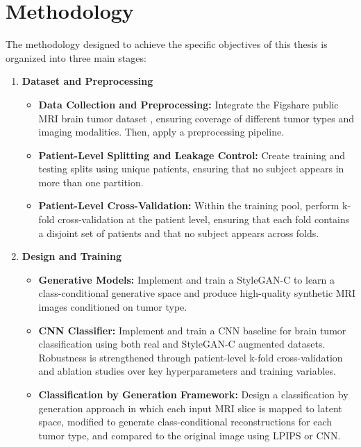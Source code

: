 \clearpage

\section{Methodology}

The methodology designed to achieve the specific objectives of this thesis is organized into three main stages:

\begin{enumerate}
    \item \textbf{Dataset and Preprocessing}
    \begin{itemize}
        \item \textbf{Data Collection and Preprocessing:} Integrate the Figshare public MRI brain tumor dataset \cite{Cheng2015}, ensuring coverage of different tumor types and imaging modalities. Then, apply a preprocessing pipeline.

        \item \textbf{Patient-Level Splitting and Leakage Control:} Create training and testing splits using unique patients, ensuring that no subject appears in more than one partition.

        \item \textbf{Patient-Level Cross-Validation:} Within the training pool, perform k-fold cross-validation at the patient level, ensuring that each fold contains a disjoint set of patients and that no subject appears across folds.

    \end{itemize}

    \item \textbf{Design and Training}
    \begin{itemize}
        \item \textbf{Generative Models:} Implement and train a StyleGAN-C to learn a class-conditional generative space and produce high-quality synthetic MRI images conditioned on tumor type.

        \item \textbf{CNN Classifier:} Implement and train a CNN baseline for brain tumor classification using both real and StyleGAN-C augmented datasets. Robustness is strengthened through patient-level k-fold cross-validation and ablation studies over key hyperparameters and training variables.

        \item \textbf{Classification by Generation Framework:} Design a classification by generation approach in which each input MRI slice is mapped to latent space, modified to generate class-conditional reconstructions for each tumor type, and compared to the original image using LPIPS or CNN.


\end{itemize}
\end{enumerate}
